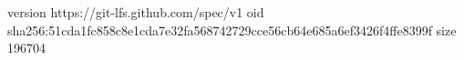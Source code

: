 version https://git-lfs.github.com/spec/v1
oid sha256:51cda1fc858c8e1cda7e32fa568742729cce56cb64e685a6ef3426f4ffe8399f
size 196704

